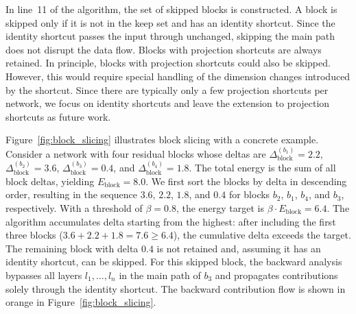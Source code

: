\documentclass[
12pt,
fancyheadings,
a4paper,
twoside,
BCOR=0.7cm,
nobcorignoretitle,
grayscalebody,
]{stsreprt}
\begin{document}
In line~11 of the algorithm, the set of skipped blocks is constructed.
A block is skipped only if it is not in the keep set and has an identity shortcut.
Since the identity shortcut passes the input through unchanged, skipping the main path does not
disrupt the data flow.
Blocks with projection shortcuts are always retained.
In principle, blocks with projection shortcuts could also be skipped.
However, this would require special handling of the dimension changes introduced by the shortcut.
Since there are typically only a few projection shortcuts per network, we focus on identity
shortcuts and leave the extension to projection shortcuts as future work.

Figure~\ref{fig:block_slicing} illustrates block slicing with a concrete example.
Consider a network with four residual blocks whose deltas are $\Delta_{\text{block}}^{(b_1)} =
2.2$, $\Delta_{\text{block}}^{(b_2)} = 3.6$, $\Delta_{\text{block}}^{(b_3)} = 0.4$, and
$\Delta_{\text{block}}^{(b_4)} = 1.8$.
The total energy is the sum of all block deltas, yielding $E_{\text{block}} = 8.0$.
We first sort the blocks by delta in descending order, resulting in the sequence $3.6$, $2.2$,
$1.8$, and $0.4$ for blocks $b_2$, $b_1$, $b_4$, and $b_3$, respectively.
With a threshold of $\beta = 0.8$, the energy target is $\beta \cdot E_{\text{block}} = 6.4$.
The algorithm accumulates delta starting from the highest: after including the first three blocks
($3.6 + 2.2 + 1.8 = 7.6 \geq 6.4$), the cumulative delta exceeds the target.
The remaining block with delta $0.4$ is not retained and, assuming it has an identity shortcut, can
be skipped.
For this skipped block, the backward analysis bypasses all layers $l_1, \dots, l_n$ in the main
path of $b_3$ and propagates contributions solely through the identity shortcut.
The backward contribution flow is shown in orange in Figure~\ref{fig:block_slicing}.
\end{document}
